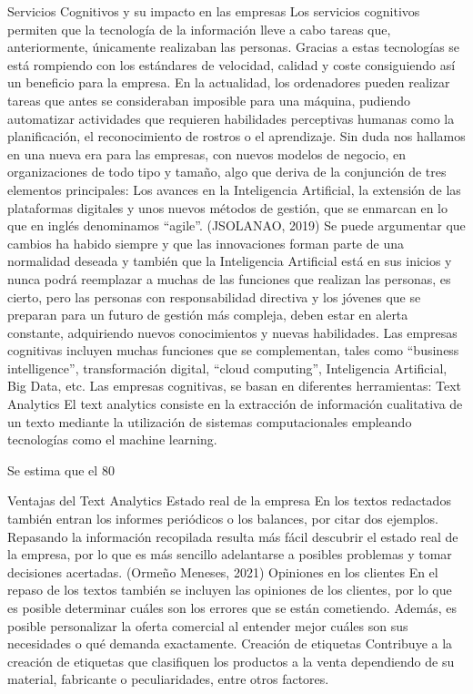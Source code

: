 Servicios Cognitivos y su impacto en las empresas
Los servicios cognitivos permiten que la tecnología de la información lleve a cabo tareas que, anteriormente, únicamente realizaban las personas. Gracias a estas tecnologías se está rompiendo con los estándares de velocidad, calidad y coste consiguiendo así un beneficio para la empresa.
En la actualidad, los ordenadores pueden realizar tareas que antes se consideraban imposible para una máquina, pudiendo automatizar actividades que requieren habilidades perceptivas humanas como la planificación, el reconocimiento de rostros o el aprendizaje. 
Sin duda nos hallamos en una nueva era para las empresas, con nuevos modelos de negocio, en organizaciones de todo tipo y tamaño, algo que deriva de la conjunción de tres elementos principales: Los avances en la Inteligencia Artificial, la extensión de las plataformas digitales y unos nuevos métodos de gestión, que se enmarcan en lo que en inglés denominamos “agile”. (JSOLANAO, 2019)
Se puede argumentar que cambios ha habido siempre y que las innovaciones forman parte de una normalidad deseada y también que la Inteligencia Artificial está en sus inicios y nunca podrá reemplazar a muchas de las funciones que realizan las personas, es cierto, pero las personas con responsabilidad directiva y los jóvenes que se preparan para un futuro de gestión más compleja, deben estar en alerta constante, adquiriendo nuevos conocimientos y nuevas habilidades.
Las empresas cognitivas incluyen muchas funciones que se complementan, tales como “business intelligence”, transformación digital, “cloud computing”, Inteligencia Artificial, Big Data, etc.
Las empresas cognitivas, se basan en diferentes herramientas:
Text Analytics
El text analytics consiste en la extracción de información cualitativa de un texto mediante la utilización de sistemas computacionales empleando tecnologías como el machine learning.

Se estima que el 80%



Ventajas del Text Analytics
Estado real de la empresa
En los textos redactados también entran los informes periódicos o los balances, por citar dos ejemplos. Repasando la información recopilada resulta más fácil descubrir el estado real de la empresa, por lo que es más sencillo adelantarse a posibles problemas y tomar decisiones acertadas. (Ormeño Meneses, 2021)
Opiniones en los clientes
En el repaso de los textos también se incluyen las opiniones de los clientes, por lo que es posible determinar cuáles son los errores que se están cometiendo. Además, es posible personalizar la oferta comercial al entender mejor cuáles son sus necesidades o qué demanda exactamente.
Creación de etiquetas
Contribuye a la creación de etiquetas que clasifiquen los productos a la venta dependiendo de su material, fabricante o peculiaridades, entre otros factores.


